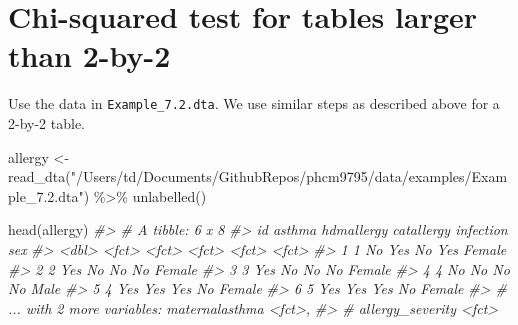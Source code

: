 \documentclass[
]{memoir}
\newenvironment{Shaded}{\begin{snugshade}}{\end{snugshade}}
\newcommand{\CommentTok}[1]{\textcolor[rgb]{0.56,0.35,0.01}{\textit{#1}}}
\newcommand{\FunctionTok}[1]{\textcolor[rgb]{0.00,0.00,0.00}{#1}}
\newcommand{\NormalTok}[1]{#1}
\newcommand{\OtherTok}[1]{\textcolor[rgb]{0.56,0.35,0.01}{#1}}
\newcommand{\SpecialCharTok}[1]{\textcolor[rgb]{0.00,0.00,0.00}{#1}}
\newcommand{\StringTok}[1]{\textcolor[rgb]{0.31,0.60,0.02}{#1}}
\begin{document}
\hypertarget{chi-squared-test-for-tables-larger-than-2-by-2}{%
\section{Chi-squared test for tables larger than 2-by-2}\label{chi-squared-test-for-tables-larger-than-2-by-2}}

Use the data in \texttt{Example\_7.2.dta}. We use similar steps as described above for a 2-by-2 table.

\begin{Shaded}
\begin{Highlighting}[]
\NormalTok{allergy }\OtherTok{\textless{}{-}} \FunctionTok{read\_dta}\NormalTok{(}\StringTok{"/Users/td/Documents/GithubRepos/phcm9795/data/examples/Example\_7.2.dta"}\NormalTok{) }\SpecialCharTok{\%\textgreater{}\%} 
  \FunctionTok{unlabelled}\NormalTok{()}

\FunctionTok{head}\NormalTok{(allergy)}
\CommentTok{\#\textgreater{} \# A tibble: 6 x 8}
\CommentTok{\#\textgreater{}      id asthma hdmallergy catallergy infection sex   }
\CommentTok{\#\textgreater{}   \textless{}dbl\textgreater{} \textless{}fct\textgreater{}  \textless{}fct\textgreater{}      \textless{}fct\textgreater{}      \textless{}fct\textgreater{}     \textless{}fct\textgreater{} }
\CommentTok{\#\textgreater{} 1     1 No     Yes        No         Yes       Female}
\CommentTok{\#\textgreater{} 2     2 Yes    No         No         No        Female}
\CommentTok{\#\textgreater{} 3     3 Yes    No         No         No        Female}
\CommentTok{\#\textgreater{} 4     4 No     No         No         No        Male  }
\CommentTok{\#\textgreater{} 5     4 Yes    Yes        Yes        No        Female}
\CommentTok{\#\textgreater{} 6     5 Yes    Yes        Yes        No        Female}
\CommentTok{\#\textgreater{} \# ... with 2 more variables: maternalasthma \textless{}fct\textgreater{},}
\CommentTok{\#\textgreater{} \#   allergy\_severity \textless{}fct\textgreater{}}
\end{Highlighting}
\end{Shaded}
\end{document}
